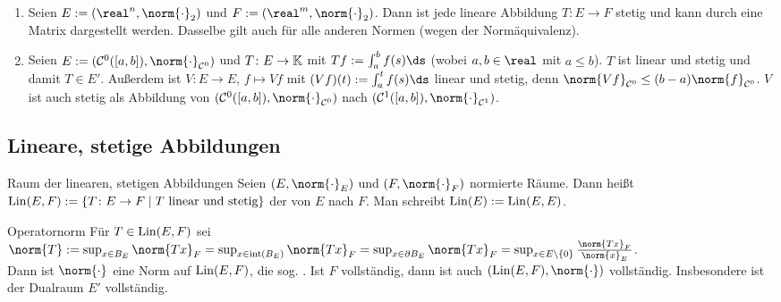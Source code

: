 \begin{Bsp}
    \begin{enumerate}[label=\emph{(\alph*)}]
        \item
        Seien $E := (\real^n, \norm{\cdot}_2)$ und $F := (\real^m, \norm{\cdot}_2)$.
        Dann ist jede lineare Abbildung $T\colon E \rightarrow F$ stetig und kann
        durch eine Matrix dargestellt werden.
        Dasselbe gilt auch für alle anderen Normen (wegen der Normäquivalenz).

        \item
        Seien $E := (\C^0([a, b]), \norm{\cdot}_{\C^0})$ und $T\colon E \rightarrow \mathbb{K}$
        mit $Tf := \int_a^b f(s)\ds$ (wobei $a, b \in \real$ mit $a \le b$).
        $T$ ist linear und stetig und damit $T \in E'$.
        Außerdem ist $V\colon E \rightarrow E$, $f \mapsto Vf$ mit
        $(Vf)(t) := \int_a^t f(s)\ds$ linear und stetig, denn
        $\norm{Vf}_{\C^0} \le (b - a) \norm{f}_{\C^0}$.
        $V$ ist auch stetig als Abbildung von
        $(\C^0([a, b]), \norm{\cdot}_{\C^0})$ nach
        $(\C^1([a, b]), \norm{\cdot}_{\C^1})$.
    \end{enumerate}
\end{Bsp}

\pagebreak

\subsection{%
    Lineare, stetige Abbildungen%
}

\begin{Def}{Raum der linearen, stetigen Abbildungen}
    Seien $(E, \norm{\cdot}_E)$ und $(F, \norm{\cdot}_F)$ normierte Räume.
    Dann heißt
    $\operatorname{Lin}(E, F) := \{T\colon E \rightarrow F \;|\; T \text{ linear und stetig}\}$
    der  von $E$ nach $F$.
    Man schreibt $\operatorname{Lin}(E) := \operatorname{Lin}(E, E)$.
\end{Def}

\begin{Satz}{Operatornorm}
    Für $T \in \operatorname{Lin}(E, F)$ sei\\
    $\norm{T} := \sup_{x \in B_E} \norm{Tx}_F =
    \sup_{x \in \interior{B_E}} \norm{Tx}_F = \sup_{x \in \partial B_E} \norm{Tx}_F =
    \sup_{x \in E \setminus \{0\}} \frac{\norm{Tx}_F}{\norm{x}_E}$.\\
    Dann ist $\norm{\cdot}$ eine Norm auf $\operatorname{Lin}(E, F)$, die sog. .
    Ist $F$ vollständig, dann ist auch $(\Lin(E, F), \norm{\cdot})$ vollständig.
    Insbesondere ist der Dualraum $E'$ vollständig.
\end{Satz}

